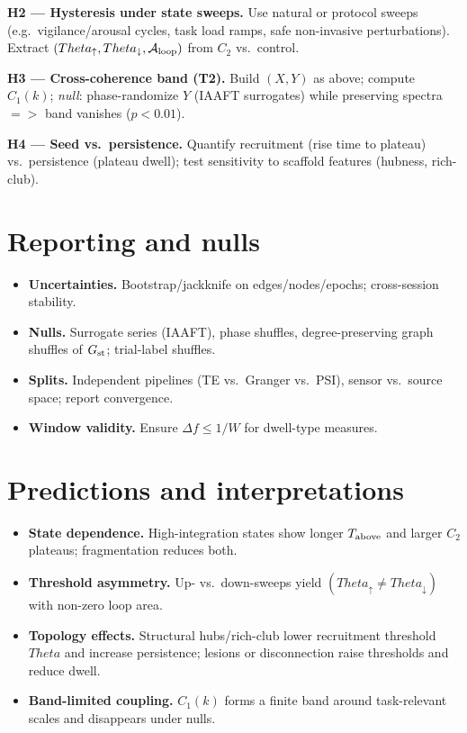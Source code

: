 \documentclass[12pt,a4paper,oneside]{scrreprt}
\def\Theta{Theta}%
\def\Rightarrow{=>}%
\begin{document}
\textbf{H2 — Hysteresis under state sweeps.}
Use natural or protocol sweeps (e.g.\ vigilance/arousal cycles, task load ramps, safe non-invasive perturbations). 
Extract $(\Theta_\uparrow,\Theta_\downarrow,\mathcal A_{\rm loop})$ from $C_2$ vs.\ control.

\textbf{H3 — Cross-coherence band (T2).}
Build $(X,Y)$ as above; compute $C_1(k)$; \emph{null}: phase-randomize $Y$ (IAAFT surrogates) while preserving spectra $\Rightarrow$ band vanishes ($p<0.01$).

\textbf{H4 — Seed vs.\ persistence.}
Quantify recruitment (rise time to plateau) vs.\ persistence (plateau dwell); test sensitivity to scaffold features (hubness, rich-club).

\section{Reporting and nulls}\label{sec:human-report}
\begin{itemize}
\item \textbf{Uncertainties.} Bootstrap/jackknife on edges/nodes/epochs; cross-session stability.
\item \textbf{Nulls.} Surrogate series (IAAFT), phase shuffles, degree-preserving graph shuffles of $G_{\rm st}$; trial-label shuffles.
\item \textbf{Splits.} Independent pipelines (TE vs.\ Granger vs.\ PSI), sensor vs.\ source space; report convergence.
\item \textbf{Window validity.} Ensure $\Delta f\le 1/W$ for dwell-type measures.
\end{itemize}

\section{Predictions and interpretations}\label{sec:human-predict}
\begin{itemize}
\item \textbf{State dependence.} High-integration states show longer $T_{\rm above}$ and larger $C_2$ plateaus; fragmentation reduces both.
\item \textbf{Threshold asymmetry.} Up- vs.\ down-sweeps yield $(\Theta_\uparrow\neq\Theta_\downarrow)$ with non-zero loop area.
\item \textbf{Topology effects.} Structural hubs/rich-club lower recruitment threshold $\Theta$ and increase persistence; lesions or disconnection raise thresholds and reduce dwell.
\item \textbf{Band-limited coupling.} $C_1(k)$ forms a finite band around task-relevant scales and disappears under nulls.
\end{itemize}
\end{document}
